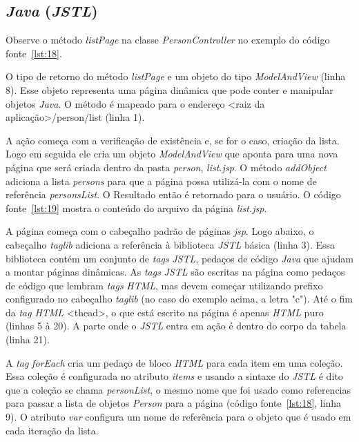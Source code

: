 \subsection{\textit{Java} (\textit{JSTL})}

Observe o método \textit{listPage} na classe \textit{PersonController} no exemplo do código fonte~\ref{lst:18}.


O tipo de retorno do método \textit{listPage} e um objeto do tipo \textit{ModelAndView} (linha 8). Esse objeto representa uma página dinâmica que pode conter e manipular objetos \textit{Java}. O método é mapeado para o endereço <raiz da aplicação>/person/list (linha 1). 

A ação começa com a verificação de existência e, se for o caso, criação da lista. Logo em seguida ele cria um objeto \textit{ModelAndView} que aponta para uma nova página que será criada dentro da pasta \textit{person}, \textit{list.jsp}. O método \textit{addObject} adiciona a lista \textit{persons} para que a página possa utilizá-la com o nome de referência \textit{personsList}. O Resultado então é retornado para o usuário. O código fonte~\ref{lst:19} mostra o conteúdo do arquivo da página \textit{list.jsp}.

\newpage


A página começa com o cabeçalho padrão de páginas \textit{jsp}. Logo abaixo, o cabeçalho \textit{taglib} adiciona a referência à biblioteca \textit{JSTL} básica (linha 3). Essa biblioteca contém um conjunto de \textit{tags} \textit{JSTL}, pedaços de código \textit{Java} que ajudam a montar páginas dinâmicas. As \textit{tags} \textit{JSTL} são escritas na página como pedaços de código que lembram \textit{tags} \textit{HTML}, mas devem começar utilizando prefixo configurado no cabeçalho \textit{taglib} (no caso do exemplo acima, a letra "c"). Até o fim da \textit{tag} \textit{HTML} <thead>, o que está escrito na página é apenas \textit{HTML} puro (linhas 5 à 20). A parte onde o \textit{JSTL} entra em ação é dentro do corpo da tabela (linha 21). 

A \textit{tag} \textit{forEach} cria um pedaço de bloco \textit{HTML} para cada item em uma coleção. Essa coleção é configurada no atributo \textit{items} e usando a sintaxe do \textit{JSTL} é dito que a coleção se chama \textit{personList}, o mesmo nome que foi usado como referencias para passar a lista de objetos \textit{Person} para a página (código fonte~\ref{lst:18}, linha 9). O atributo \textit{var} configura um nome de referência para o objeto que é usado em cada iteração da lista.

